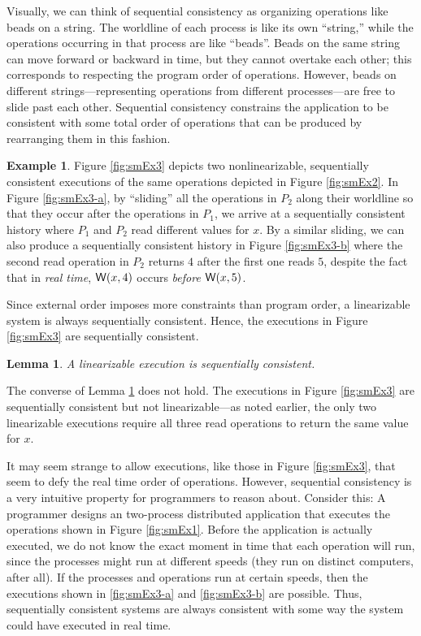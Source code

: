 \documentclass[]             %
{NASA}                       %
\newtheorem{lemma}[theorem]{Lemma}
\theoremstyle{definition}
\newtheorem{example}[theorem]{Example}
\begin{document}
Visually, we can think of sequential consistency as organizing
operations like beads on a string. The worldline of each process is
like its own ``string,'' while the operations occurring in that
process are like ``beads''. Beads on the same string can move forward
or backward in time, but they cannot overtake each other; this
corresponds to respecting the program order of operations. However,
beads on different strings---representing operations from different
processes---are free to slide past each other. Sequential consistency
constrains the application to be consistent with some total order of
operations that can be produced by rearranging them in this fashion.

\begin{example}
  Figure \ref{fig:smEx3} depicts two nonlinearizable, sequentially
  consistent executions of the same operations depicted in Figure
  \ref{fig:smEx2}. In Figure \ref{fig:smEx3-a}, by ``sliding'' all the
  operations in $P_2$ along their worldline so that they occur after
  the operations in $P_1$, we arrive at a sequentially consistent
  history where $P_1$ and $P_2$ read different values for $x$. By a
  similar sliding, we can also produce a sequentially consistent
  history in Figure \ref{fig:smEx3-b} where the second read operation
  in $P_2$ returns $4$ after the first one reads $5$, despite the fact
  that in \emph{real time}, $\mathsf{W}\!\left(x, 4\right)$ occurs \emph{before}
  $\mathsf{W}\!\left(x, 5\right)$.
\end{example}

Since external order imposes more constraints than program order, a
linearizable system is always sequentially consistent. Hence, the
executions in Figure \ref{fig:smEx3} are sequentially consistent.
\begin{lemma}
  \label{lem:linearsequential}
  A linearizable execution is sequentially consistent.
\end{lemma}

The converse of Lemma \ref{lem:linearsequential} does not hold. The
executions in Figure \ref{fig:smEx3} are sequentially consistent but
not linearizable---as noted earlier, the only two linearizable
executions require all three read operations to return the same value
for $x$.

It may seem strange to allow executions, like those in Figure
\ref{fig:smEx3}, that seem to defy the real time order of
operations. However, sequential consistency is a very intuitive
property for programmers to reason about. Consider this: A programmer
designs an two-process distributed application that executes the
operations shown in Figure \ref{fig:smEx1}. Before the application is
actually executed, we do not know the exact moment in time that each
operation will run, since the processes might run at different speeds
(they run on distinct computers, after all). If the processes and
operations run at certain speeds, then the executions shown in
\ref{fig:smEx3-a} and \ref{fig:smEx3-b} are possible. Thus,
sequentially consistent systems are always consistent with some way
the system could have executed in real time.
\end{document}
